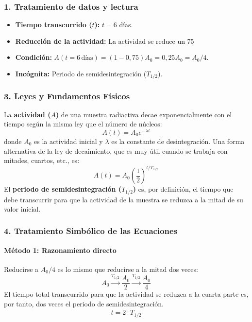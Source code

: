\subsubsection*{1. Tratamiento de datos y lectura}
\begin{itemize}
    \item \textbf{Tiempo transcurrido ($t$):} $t = 6$ días.
    \item \textbf{Reducción de la actividad:} La actividad se reduce un 75%
    \item \textbf{Condición:} $A(t=6\,\text{días}) = (1 - 0,75) A_0 = 0,25 A_0 = A_0/4$.
    \item \textbf{Incógnita:} Periodo de semidesintegración ($T_{1/2}$).
\end{itemize}

\subsubsection*{3. Leyes y Fundamentos Físicos}
La \textbf{actividad ($A$)} de una muestra radiactiva decae exponencialmente con el tiempo según la misma ley que el número de núcleos:
$$ A(t) = A_0 e^{-\lambda t} $$
donde $A_0$ es la actividad inicial y $\lambda$ es la constante de desintegración.
Una forma alternativa de la ley de decaimiento, que es muy útil cuando se trabaja con mitades, cuartos, etc., es:
$$ A(t) = A_0 \left(\frac{1}{2}\right)^{t/T_{1/2}} $$
El \textbf{periodo de semidesintegración ($T_{1/2}$)} es, por definición, el tiempo que debe transcurrir para que la actividad de la muestra se reduzca a la mitad de su valor inicial.

\subsubsection*{4. Tratamiento Simbólico de las Ecuaciones}
\paragraph{Método 1: Razonamiento directo}
Reducirse a $A_0/4$ es lo mismo que reducirse a la mitad dos veces:
$$ A_0 \xrightarrow{T_{1/2}} \frac{A_0}{2} \xrightarrow{T_{1/2}} \frac{A_0}{4} $$
El tiempo total transcurrido para que la actividad se reduzca a la cuarta parte es, por tanto, dos veces el periodo de semidesintegración.
\begin{gather}
    t = 2 \cdot T_{1/2}
\end{gather}
